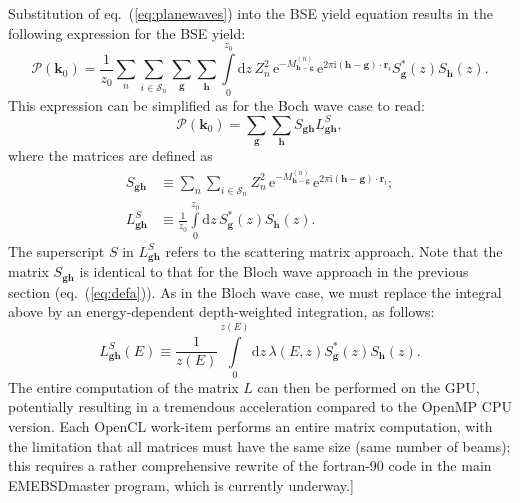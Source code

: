 \documentclass[DIV=calc, paper=letter, fontsize=11pt]{scrartcl}	 %
\begin{document}
{Substitution of eq.~(\ref{eq:planewaves}) into the BSE yield equation results in the following expression 
for the BSE yield:
\begin{equation}
	\mathcal{P}(\mathbf{k}_0) = \frac{1}{z_0}\sum_{n}\sum_{i\in\mathcal{S}_n}\sum_{\mathbf{g}}\sum_{\mathbf{h}} \int\limits_{0}^{z_{0}} \mathrm{d}z\,
	 Z^2_n\,\mathrm{e}^{-M^{(n)}_{\mathbf{h}-\mathbf{g}}}\,\mathrm{e}^{2\pi\mathrm{i} (\mathbf{h}-\mathbf{g})\cdot\mathbf{r}_{i}} 
	S^{\ast}_{\mathbf{g}}(z) S_{\mathbf{h}}(z).
    \label{eq:prob2}
\end{equation}
This expression can be simplified as for the Boch wave case to read:
\begin{equation}
	\mathcal{P}(\mathbf{k}_0) = \sum_{\mathbf{g}}\sum_{\mathbf{h}} S_{\mathbf{g}\mathbf{h}} L^{S}_{\mathbf{g}\mathbf{h}},
    \label{eq:prob2}
\end{equation}
where the matrices are defined as
\begin{subequations}
\begin{align}
    S_{\mathbf{g}\mathbf{h}} &\equiv \sum_{n}\sum_{i\in\mathcal{S}_n} Z^2_n\,\mathrm{e}^{-M^{(n)}_{\mathbf{h}-\mathbf{g}}}\,\mathrm{e}^{2\pi\mathrm{i} 
    (\mathbf{h}-\mathbf{g})\cdot\mathbf{r}_{i}};\label{eq:defnewa}\\
    L^{S}_{\mathbf{g}\mathbf{h}} &\equiv \frac{1}
    {z_{0}}\int\limits_{0}^{z_{0}} \mathrm{d}z\,  S^{\ast}_{\mathbf{g}}(z) S_{\mathbf{h}}(z).
    \label{eq:defnewb}
\end{align}
\end{subequations}
The superscript $S$ in $L^{S}_{\mathbf{g}\mathbf{h}}$ refers to the scattering matrix approach.  Note that the matrix 
$S_{\mathbf{g}\mathbf{h}}$ is identical to that for the Bloch wave approach in the previous section (eq.~(\ref{eq:defa})).  
As in the Bloch wave case, we must replace the integral above by an energy-dependent depth-weighted integration, as follows:
\begin{equation}
	L^{S}_{\mathbf{g}\mathbf{h}}(E) \equiv  \frac{1}{z(E)}\int\limits_{0}^{z(E)} \mathrm{d}z\,  
    \lambda(E,z) S^{\ast}_{\mathbf{g}}(z) S_{\mathbf{h}}(z).
\end{equation}
The entire computation of the matrix $L$ can then be performed on the GPU, potentially resulting in a tremendous acceleration compared to the 
OpenMP CPU version.  Each OpenCL work-item performs an entire matrix computation, with the limitation that all 
matrices must have the same size (same number of beams); this requires a rather comprehensive rewrite of the fortran-90 
code in the main \textsf{EMEBSDmaster} program, which is currently underway.]
}
\end{document}
